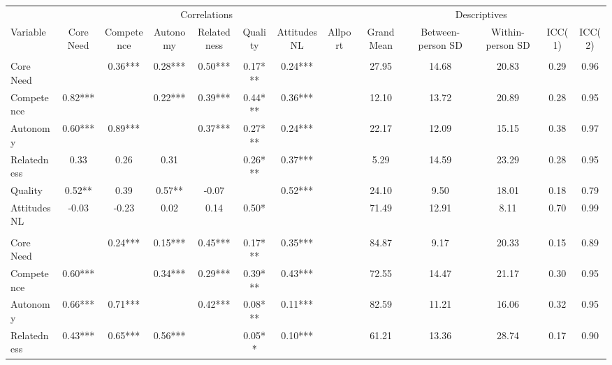 \begin{table}
\centering
\begin{tabular}[t]{lccccccc | ccccc}
\toprule
\multicolumn{1}{c}{} & \multicolumn{7}{c}{Correlations} & \multicolumn{5}{c}{Descriptives} \\
\cmidrule(l{3pt}r{3pt}){2-8} \cmidrule(l{3pt}r{3pt}){9-13}
Variable & Core Need & Competence & Autonomy & Relatedness & Quality & Attitudes NL & Allport & Grand Mean & Between-person SD & Within-person SD & ICC(1) & ICC(2)\\
\midrule
\addlinespace[0.3em]
\multicolumn{13}{l}{\textbf{Study 1}}\\
\hspace{1em}Core Need &  & 0.36*** & 0.28*** & 0.50*** & 0.17*** & 0.24*** &  & 27.95 & 14.68 & 20.83 & 0.29 & 0.96\\
\hspace{1em}Competence & 0.82*** &  & 0.22*** & 0.39*** & 0.44*** & 0.36*** &  & 12.10 & 13.72 & 20.89 & 0.28 & 0.95\\
\hspace{1em}Autonomy & 0.60*** & 0.89*** &  & 0.37*** & 0.27*** & 0.24*** &  & 22.17 & 12.09 & 15.15 & 0.38 & 0.97\\
\hspace{1em}Relatedness & 0.33 & 0.26 & 0.31 &  & 0.26*** & 0.37*** &  & 5.29 & 14.59 & 23.29 & 0.28 & 0.95\\
\hspace{1em}Quality & 0.52** & 0.39 & 0.57** & -0.07 &  & 0.52*** &  & 24.10 & 9.50 & 18.01 & 0.18 & 0.79\\
\hspace{1em}Attitudes NL & -0.03 & -0.23 & 0.02 & 0.14 & 0.50* &  &  & 71.49 & 12.91 & 8.11 & 0.70 & 0.99\\
\addlinespace[0.3em]
\multicolumn{13}{l}{\textbf{Study 2}}\\
\hspace{1em}Core Need &  & 0.24*** & 0.15*** & 0.45*** & 0.17*** & 0.35*** &  & 84.87 & 9.17 & 20.33 & 0.15 & 0.89\\
\hspace{1em}Competence & 0.60*** &  & 0.34*** & 0.29*** & 0.39*** & 0.43*** &  & 72.55 & 14.47 & 21.17 & 0.30 & 0.95\\
\hspace{1em}Autonomy & 0.66*** & 0.71*** &  & 0.42*** & 0.08*** & 0.11*** &  & 82.59 & 11.21 & 16.06 & 0.32 & 0.95\\
\hspace{1em}Relatedness & 0.43*** & 0.65*** & 0.56*** &  & 0.05** & 0.10*** &  & 61.21 & 13.36 & 28.74 & 0.17 & 0.90\\

\end{tabular}
\end{table}
